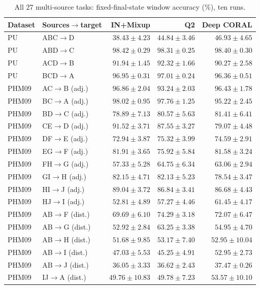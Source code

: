 \begin{table}[pos=htbp]
\centering\footnotesize
\caption{All 27 multi-source tasks: fixed-final-state window accuracy (\%), ten runs.}
\label{tab:taskscores}
\begin{tabular}{llrrr}
\toprule
Dataset & Sources$\to$target & IN+Mixup & Q2 & Deep CORAL\\
\midrule
PU & ABC$\to$D & $38.43\pm4.23$ & $44.84\pm3.46$ & $46.93\pm4.65$\\
PU & ABD$\to$C & $98.42\pm0.29$ & $98.31\pm0.25$ & $98.40\pm0.30$\\
PU & ACD$\to$B & $91.94\pm1.45$ & $92.32\pm1.66$ & $90.27\pm2.58$\\
PU & BCD$\to$A & $96.95\pm0.31$ & $97.01\pm0.24$ & $96.36\pm0.51$\\
PHM09 & AC$\to$B (adj.) & $96.86\pm2.04$ & $93.24\pm2.03$ & $96.43\pm1.78$\\
PHM09 & BC$\to$A (adj.) & $98.02\pm0.95$ & $97.76\pm1.25$ & $95.22\pm2.45$\\
PHM09 & BD$\to$C (adj.) & $78.89\pm7.13$ & $80.57\pm5.63$ & $81.41\pm6.41$\\
PHM09 & CE$\to$D (adj.) & $91.52\pm3.71$ & $87.55\pm3.27$ & $79.07\pm4.48$\\
PHM09 & DF$\to$E (adj.) & $72.94\pm3.87$ & $75.32\pm3.99$ & $74.59\pm2.91$\\
PHM09 & EG$\to$F (adj.) & $81.91\pm3.65$ & $75.92\pm5.84$ & $81.58\pm3.24$\\
PHM09 & FH$\to$G (adj.) & $57.33\pm5.28$ & $64.75\pm6.34$ & $63.06\pm2.94$\\
PHM09 & GI$\to$H (adj.) & $82.15\pm4.71$ & $82.13\pm5.23$ & $78.54\pm3.47$\\
PHM09 & HI$\to$J (adj.) & $89.04\pm3.72$ & $86.84\pm3.41$ & $86.68\pm4.43$\\
PHM09 & HJ$\to$I (adj.) & $52.81\pm4.89$ & $57.27\pm4.46$ & $61.45\pm4.17$\\
PHM09 & AB$\to$F (dist.) & $69.69\pm6.10$ & $74.29\pm3.18$ & $72.07\pm6.47$\\
PHM09 & AB$\to$G (dist.) & $52.92\pm2.84$ & $63.25\pm3.38$ & $54.95\pm4.70$\\
PHM09 & AB$\to$H (dist.) & $51.68\pm9.85$ & $53.17\pm7.40$ & $52.95\pm10.04$\\
PHM09 & AB$\to$I (dist.) & $47.03\pm5.53$ & $45.25\pm4.91$ & $52.95\pm2.73$\\
PHM09 & AB$\to$J (dist.) & $36.05\pm3.33$ & $36.62\pm2.43$ & $37.47\pm0.26$\\
PHM09 & IJ$\to$A (dist.) & $49.76\pm10.83$ & $49.78\pm7.23$ & $53.57\pm10.10$\\

\end{tabular}
\end{table}
